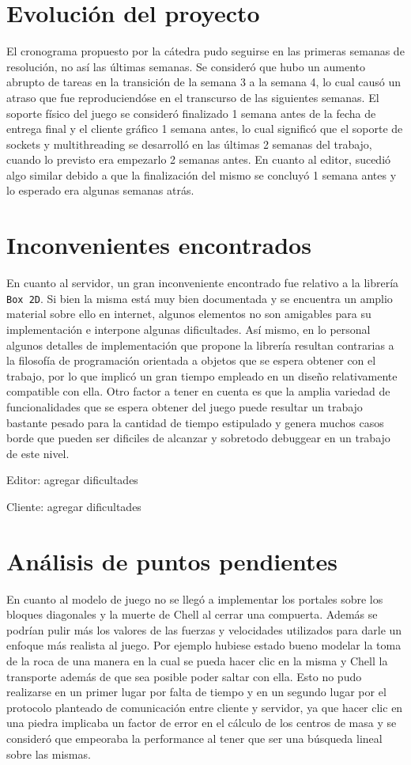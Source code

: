 \documentclass[a4paper]{article}
\begin{document}
\section{Evolución del proyecto}
El cronograma propuesto por la cátedra pudo seguirse en las primeras semanas de resolución, no así las últimas semanas. Se consideró que hubo un aumento abrupto de tareas en la transición de la semana 3 a la semana 4, lo cual causó un atraso que fue reproduciendóse en el transcurso de las siguientes semanas. El soporte físico del juego se consideró finalizado 1 semana antes de la fecha de entrega final y el cliente gráfico 1 semana antes, lo cual significó que el soporte de sockets y multithreading se desarrolló en las últimas 2 semanas del trabajo, cuando lo previsto era empezarlo 2 semanas antes. En cuanto al editor, sucedió algo similar debido a que la finalización del mismo se concluyó 1 semana antes y lo esperado era algunas semanas atrás. 

\section{Inconvenientes encontrados}
En cuanto al servidor, un gran inconveniente encontrado fue relativo a la librería \texttt{Box 2D}. Si bien la misma está muy bien documentada y se encuentra un amplio material sobre ello en internet, algunos elementos no son amigables para su implementación e interpone algunas dificultades. Así mismo, en lo personal algunos detalles de implementación que propone la librería resultan contrarias a la filosofía de programación orientada a objetos que se espera obtener con el trabajo, por lo que implicó un gran tiempo empleado en un diseño relativamente compatible con ella. Otro factor a tener en cuenta es que la amplia variedad de funcionalidades que se espera obtener del juego puede resultar un trabajo bastante pesado para la cantidad de tiempo estipulado y genera muchos casos borde que pueden ser dificiles de alcanzar y sobretodo debuggear en un trabajo de este nivel.

Editor: agregar dificultades

Cliente: agregar dificultades

\section{Análisis de puntos pendientes}

En cuanto al modelo de juego no se llegó a implementar los portales sobre los bloques diagonales y la muerte de Chell al cerrar una compuerta. Además se podrían pulir más los valores de las fuerzas y velocidades utilizados para darle un enfoque más realista al juego. Por ejemplo hubiese estado bueno modelar la toma de la roca de una manera en la cual se pueda hacer clic en la misma y Chell la transporte además de que sea posible poder saltar con ella. Esto no pudo realizarse en un primer lugar por falta de tiempo y en un segundo lugar por el protocolo planteado de comunicación entre cliente y servidor, ya que hacer clic en una piedra implicaba un factor de error en el cálculo de los centros de masa y se consideró que empeoraba la performance al tener que ser una búsqueda lineal sobre las mismas. 
\end{document}
